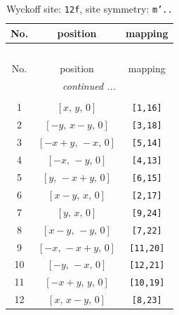 \documentclass[fleqn,8pt]{jsarticle}
\begin{document}
\begin{longtable}{ccc}
\caption{Wyckoff site: {\tt 12f}, site symmetry: {\tt m'..}}
 \\
 \hline \hline
No. & position & mapping \\ \hline \endfirsthead

\multicolumn{2}{l}{\tablename\ \thetable{}} \\
 \hline \hline
No. & position & mapping \\ \hline \endhead

 \hline \hline
\multicolumn{2}{r}{\footnotesize\it continued ...} \\ \endfoot

 \hline \hline
\multicolumn{2}{r}{} \\ \endlastfoot

1 & $\left[ x,\, y,\, 0 \right]$ & {\tt [1,16]} \\ \hline
2 & $\left[ - y,\, x - y,\, 0 \right]$ & {\tt [3,18]} \\ \hline
3 & $\left[ - x + y,\, - x,\, 0 \right]$ & {\tt [5,14]} \\ \hline
4 & $\left[ - x,\, - y,\, 0 \right]$ & {\tt [4,13]} \\ \hline
5 & $\left[ y,\, - x + y,\, 0 \right]$ & {\tt [6,15]} \\ \hline
6 & $\left[ x - y,\, x,\, 0 \right]$ & {\tt [2,17]} \\ \hline
7 & $\left[ y,\, x,\, 0 \right]$ & {\tt [9,24]} \\ \hline
8 & $\left[ x - y,\, - y,\, 0 \right]$ & {\tt [7,22]} \\ \hline
9 & $\left[ - x,\, - x + y,\, 0 \right]$ & {\tt [11,20]} \\ \hline
10 & $\left[ - y,\, - x,\, 0 \right]$ & {\tt [12,21]} \\ \hline
11 & $\left[ - x + y,\, y,\, 0 \right]$ & {\tt [10,19]} \\ \hline
12 & $\left[ x,\, x - y,\, 0 \right]$ & {\tt [8,23]} \\
\end{longtable}
\renewcommand{\arraystretch}{1.2}
\end{document}
